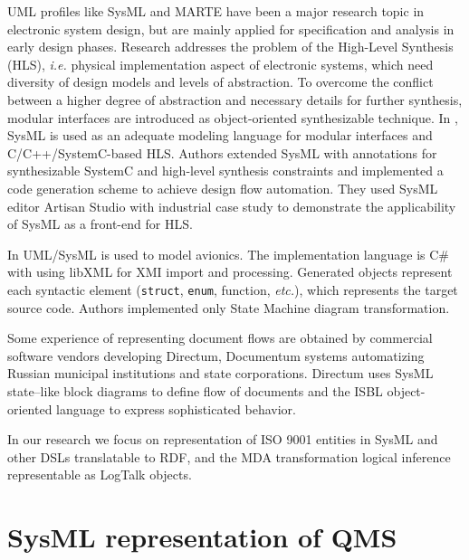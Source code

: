 \documentclass[conference]{IEEEtran}
\begin{document}
UML profiles like SysML and MARTE have been a major research topic in electronic system design, but are mainly applied for specification and analysis in early design phases.  Research \cite{mish} addresses the problem of the High-Level Synthesis (HLS), \emph{i.e.} physical implementation aspect of electronic systems, which need diversity of design models and levels of abstraction.  To overcome the conflict between a higher degree of abstraction and necessary details for further synthesis, modular interfaces are introduced as object-oriented synthesizable technique. In \cite{mish}, SysML is used as an adequate modeling language for modular interfaces and C/C++/SystemC-based HLS. Authors extended SysML with annotations for synthesizable SystemC and high-level synthesis constraints and implemented a code generation scheme to achieve design flow automation. They used SysML editor Artisan Studio with industrial case study to demonstrate the applicability of SysML as a front-end for HLS.

In \cite{tom16} UML/SysML is used to model avionics.  The implementation language is C\# with using libXML for XMI import and processing.  Generated objects represent each syntactic element (\texttt{struct}, \texttt{enum}, function, \emph{etc.}), which represents the target source code.  Authors implemented only State Machine diagram transformation.


Some experience of representing document flows are obtained by commercial software vendors developing Directum, Documentum systems automatizing Russian municipal institutions and state corporations.  Directum uses SysML state--like block diagrams to define flow of documents and the ISBL object-oriented language to express sophisticated behavior.


In our research we focus on representation of ISO 9001 entities in SysML and other DSLs translatable to RDF, and the MDA transformation logical inference representable as LogTalk objects.

\section{SysML representation of QMS}
\end{document}

